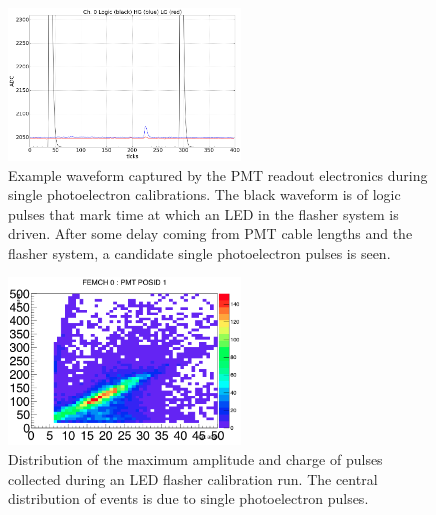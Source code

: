 \begin{figure}
\centering 
\includegraphics[width=0.55\textwidth]{./figures/sample_flasher_spe.png}
\caption{Example waveform captured by the PMT readout electronics during single photoelectron calibrations.  The black waveform is of logic pulses that mark time at which an LED in the flasher system is driven.  After some delay coming from PMT cable lengths and the flasher system, a candidate single photoelectron pulses is seen.}
 \label{fig:example_spe_wfm}
 \end{figure}


\begin{figure}
\centering 
\includegraphics[width=0.55\textwidth]{./figures/h2_ch0_pmt1.png}
\caption{Distribution of the maximum amplitude and charge of pulses collected during an LED flasher calibration run. The central distribution of events is due to single photoelectron pulses.}
 \label{fig:example_spe_pulsedist} 
\end{figure}





